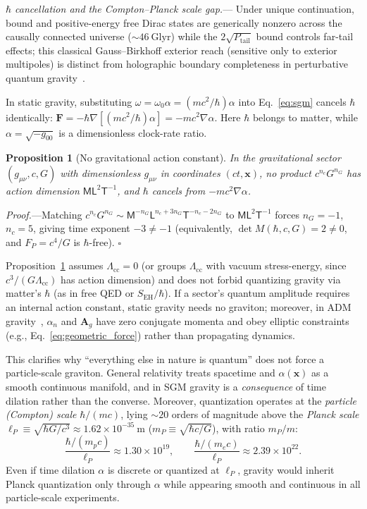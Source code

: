 \documentclass[aps,prl,reprint,superscriptaddress,nofootinbib,floatfix]{revtex4-2}
\theoremstyle{prlthm}
\newtheorem{proposition}{Proposition}
\newcommand{\prlsec}[1]{\par\smallskip\noindent\emph{#1.}---}
\begin{document}
\prlsec{$\hbar$ cancellation and the Compton--Planck scale gap}
Under unique continuation, bound and positive-energy free Dirac states are generically nonzero across the causally connected universe ($\sim 46~\text{Glyr}$) while the $2\sqrt{P_\text{tail}}$ bound controls far-tail effects; this classical Gauss--Birkhoff exterior reach (sensitive only to exterior multipoles) is distinct from holographic boundary completeness in perturbative quantum gravity~\citep{Bousso2002,Marolf2009}.

In static gravity, substituting $\omega=\omega_0\alpha=(mc^2/\hbar)\alpha$ into Eq.~\eqref{eq:sgm} cancels $\hbar$ identically: $\mathbf{F}=-\hbar\nabla[(mc^2/\hbar)\alpha]=-mc^2\nabla\alpha$. Here $\hbar$ belongs to matter, while $\alpha=\sqrt{-g_{00}}$ is a dimensionless clock-rate ratio.
\begin{proposition}[No gravitational action constant]\label{prop:no_grav_action}
In the gravitational sector $(g_{\mu\nu},c,G)$ with dimensionless $g_{\mu\nu}$ in coordinates $(ct,\mathbf{x})$, no product $c^{n_c}G^{n_G}$ has action dimension $\mathsf{M}\mathsf{L}^2\mathsf{T}^{-1}$, and $\hbar$ cancels from $-mc^2\nabla\alpha$.
\end{proposition}
\emph{Proof.}---Matching $c^{n_c}G^{n_G}\sim\mathsf{M}^{-n_G}\mathsf{L}^{n_c+3n_G}\mathsf{T}^{-n_c-2n_G}$ to $\mathsf{M}\mathsf{L}^2\mathsf{T}^{-1}$ forces $n_G=-1$, $n_c=5$, giving time exponent $-3\neq -1$ (equivalently, $\det M(\hbar,c,G)=2\neq 0$, and $F_P=c^4/G$ is $\hbar$-free). \hfill$\square$

Proposition~\ref{prop:no_grav_action} assumes $\Lambda_\text{cc}=0$ (or groups $\Lambda_\text{cc}$ with vacuum stress-energy, since $c^3/(G\Lambda_\text{cc})$ has action dimension) and does not forbid quantizing gravity via matter's $\hbar$ (as in free QED or $S_\text{EH}/\hbar$). If a sector's quantum amplitude requires an internal action constant, static gravity needs no graviton; moreover, in ADM gravity~\citep{Arnowitt2008Dynamics}, $\alpha_n$ and $\mathbf{A}_g$ have zero conjugate momenta and obey elliptic constraints (e.g., Eq.~\eqref{eq:geometric_force}) rather than propagating dynamics.

This clarifies why ``everything else in nature is quantum'' does not force a particle-scale graviton. General relativity treats spacetime and $\alpha(\mathbf{x})$ as a smooth continuous manifold, and in SGM gravity is a \emph{consequence} of time dilation rather than the converse. Moreover, quantization operates at the \emph{particle (Compton) scale} $\hbar/(mc)$, lying $\sim 20$ orders of magnitude above the \emph{Planck scale} $\ell_P\equiv\sqrt{\hbar G/c^3}\approx 1.62\times 10^{-35}~\text{m}$ ($m_P\equiv\sqrt{\hbar c/G}$), with ratio $m_P/m$:
\begin{equation}
  \frac{\hbar/(m_p c)}{\ell_P}\approx 1.30\times 10^{19},\qquad \frac{\hbar/(m_e c)}{\ell_P}\approx 2.39\times 10^{22}.
  \label{eq:compton_planck}
\end{equation}
Even if time dilation $\alpha$ is discrete or quantized at $\ell_P$, gravity would inherit Planck quantization only through $\alpha$ while appearing smooth and continuous in all particle-scale experiments.
\end{document}
